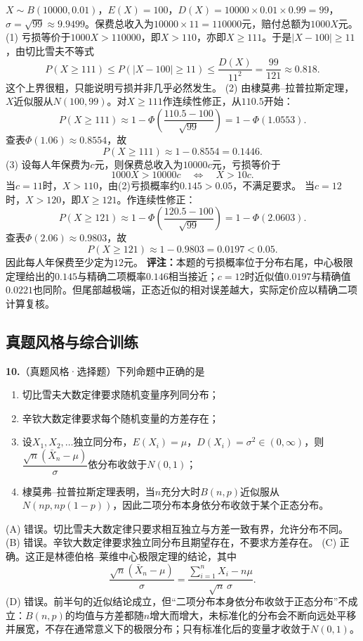 \ifshowsolutions%
$X\sim B(10000,0.01)$，$E(X)=100$，$D(X)=10000\times0.01\times0.99=99$，$\sigma=\sqrt{99}\approx9.9499$。保费总收入为$10000\times11=110000$元，赔付总额为$1000X$元。
(1) 亏损等价于$1000X>110000$，即$X>110$，亦即$X\geq111$。于是$|X-100|\geq11$，由切比雪夫不等式
\[
P(X\geq111)\leq P(|X-100|\geq11)\leq\frac{D(X)}{11^2}=\frac{99}{121}\approx0.818.
\]
这个上界很粗，只能说明亏损并非几乎必然发生。
(2) 由棣莫弗--拉普拉斯定理，$X$近似服从$N(100,99)$。对$X\geq111$作连续性修正，从$110.5$开始：
\[
P(X\geq111)\approx1-\Phi\!\left(\frac{110.5-100}{\sqrt{99}}\right)
=1-\Phi(1.0553).
\]
查表$\Phi(1.06)\approx0.8554$，故
\[
P(X\geq111)\approx1-0.8554=0.1446.
\]
(3) 设每人年保费为$c$元，则保费总收入为$10000c$元，亏损等价于
\[
1000X>10000c\quad\Longleftrightarrow\quad X>10c.
\]
当$c=11$时，$X>110$，由(2)亏损概率约$0.145>0.05$，不满足要求。
当$c=12$时，$X>120$，即$X\geq121$。作连续性修正：
\[
P(X\geq121)\approx1-\Phi\!\left(\frac{120.5-100}{\sqrt{99}}\right)
=1-\Phi(2.0603).
\]
查表$\Phi(2.06)\approx0.9803$，故
\[
P(X\geq121)\approx1-0.9803=0.0197<0.05.
\]
因此每人年保费至少定为$12$元。
\textbf{评注：}本题的亏损概率位于分布右尾，中心极限定理给出的$0.145$与精确二项概率$0.146$相当接近；$c=12$时近似值$0.0197$与精确值$0.0221$也同阶。但尾部越极端，正态近似的相对误差越大，实际定价应以精确二项计算复核。
\par\noindent{}

\vspace{0.4cm}

\else \answerarea[10] \fi%
%
\subsection{真题风格与综合训练}
%
\textbf{10.}（真题风格·选择题）下列命题中正确的是
\begin{enumerate}[label=(\Alph*),leftmargin=2.2em,itemsep=2pt]
    \item 切比雪夫大数定律要求随机变量序列同分布；
    \item 辛钦大数定律要求每个随机变量的方差存在；
    \item 设$X_1,X_2,\ldots$独立同分布，$E(X_i)=\mu$，$D(X_i)=\sigma^2\in(0,\infty)$，则$\dfrac{\sqrt n(\bar X_n-\mu)}{\sigma}$依分布收敛于$N(0,1)$；
    \item 棣莫弗--拉普拉斯定理表明，当$n$充分大时$B(n,p)$近似服从$N(np,np(1-p))$，因此二项分布本身依分布收敛于某个正态分布。
\end{enumerate}

\ifshowsolutions%
(A) 错误。切比雪夫大数定律只要求相互独立与方差一致有界，允许分布不同。
(B) 错误。辛钦大数定律要求独立同分布且期望存在，不要求方差存在。
(C) 正确。这正是林德伯格--莱维中心极限定理的结论，其中
\[
\frac{\sqrt n(\bar X_n-\mu)}{\sigma}=\frac{\sum_{i=1}^{n}X_i-n\mu}{\sqrt n\,\sigma}.
\]
(D) 错误。前半句的近似结论成立，但“二项分布本身依分布收敛于正态分布”不成立：$B(n,p)$的均值与方差都随$n$增大而增大，未标准化的分布会不断向远处平移并展宽，不存在通常意义下的极限分布；只有标准化后的变量才收敛于$N(0,1)$。
\par\noindent{}

